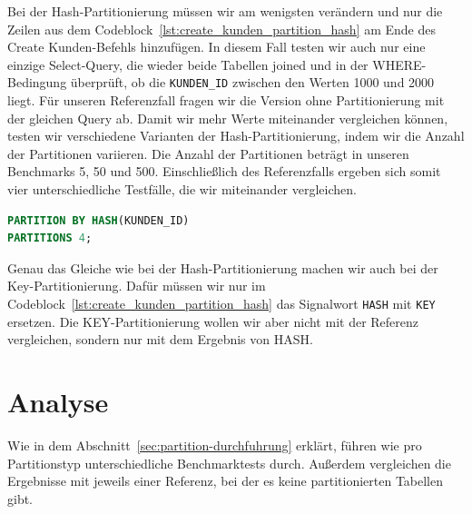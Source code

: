 Bei der Hash-Partitionierung müssen wir am wenigsten verändern und nur die Zeilen aus dem Codeblock~\ref{lst:create_kunden_partition_hash} am Ende des Create Kunden-Befehls hinzufügen.
In diesem Fall testen wir auch nur eine einzige Select-Query, die wieder beide Tabellen joined und in der WHERE-Bedingung überprüft, ob die \texttt{KUNDEN\_ID} zwischen den Werten 1000 und 2000 liegt.
Für unseren Referenzfall fragen wir die Version ohne Partitionierung mit der gleichen Query ab.
Damit wir mehr Werte miteinander vergleichen können, testen wir verschiedene Varianten der Hash-Partitionierung, indem wir die Anzahl der Partitionen variieren.
Die Anzahl der Partitionen beträgt in unseren Benchmarks 5, 50 und 500.
Einschließlich des Referenzfalls ergeben sich somit vier unterschiedliche Testfälle, die wir miteinander vergleichen.

\vspace{-5pt}
\begin{lstlisting}[language=SQL,caption=Hash-Partitonierung,label={lst:create_kunden_partition_hash}]
PARTITION BY HASH(KUNDEN_ID)
PARTITIONS 4;
\end{lstlisting}
\vspace{-5pt}

Genau das Gleiche wie bei der Hash-Partitionierung machen wir auch bei der Key-Partitionierung.
Dafür müssen wir nur im Codeblock~\ref{lst:create_kunden_partition_hash} das Signalwort \texttt{HASH} mit \texttt{KEY} ersetzen.
Die KEY-Partitionierung wollen wir aber nicht mit der Referenz vergleichen, sondern nur mit dem Ergebnis von HASH\@.

\section{Analyse}\label{sec:partition-analyse}
Wie in dem Abschnitt~\ref{sec:partition-durchfuhrung} erklärt, führen wie pro Partitionstyp unterschiedliche Benchmarktests durch.
Außerdem vergleichen die Ergebnisse mit jeweils einer Referenz, bei der es keine partitionierten Tabellen gibt.

